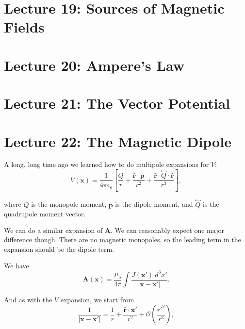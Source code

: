 \documentclass{article}
\numberwithin{equation}{section}
\newcommand{\rhat}{\mathbf{\hat{r}}}
\begin{document}
\section*{Lecture 19: Sources of Magnetic Fields}
\setcounter{page}{1}


\newpage

\section*{Lecture 20: Ampere's Law}
\setcounter{page}{1}


\newpage

\section*{Lecture 21: The Vector Potential}
\setcounter{page}{1}


\newpage

\section*{Lecture 22: The Magnetic Dipole}
\setcounter{page}{1}


A long, long time ago we learned how to do multipole expansions for $V$:
\begin{equation*}
    V(\bm{x}) = \frac{1}{4\pi\epsilon_o} \left[ \frac{Q}{r} + \frac{\rhat \cdot \bm{p}}{r^2} + \frac{\rhat \cdot \overset{\longleftrightarrow}{Q} \cdot \rhat}{r^3} \right],
\end{equation*}

where $Q$ is the monopole moment, $\bm{p}$ is the dipole moment, and $\overset{\longleftrightarrow}{Q}$ is the quadrupole moment vector.

We can do a similar expansion of $\bm{A}$. We can reasonably expect one major difference though. There are no magnetic monopoles, so the leading term in the expansion should be the dipole term.

We have
\begin{equation*}
    \bm{A}(\bm{x}) = \frac{\mu_o}{4\pi} \int \frac{J(\bm{x}')\ d^3x'}{\left| \bm{x} - \bm{x}' \right|}.
\end{equation*}

And as with the $V$ expansion, we start from
\begin{equation*}
    \frac{1}{\left| \bm{x} - \bm{x}' \right|} = \frac{1}{r} + \frac{\rhat \cdot \bm{x}'}{r^2} + \mathcal{O}\left( \frac{r'^2}{r^3} \right),
\end{equation*}
\end{document}

